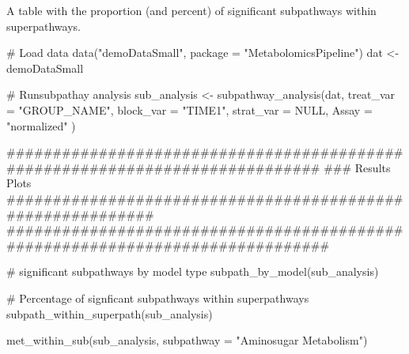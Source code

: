 \documentclass[a4paper]{book}
\begin{document}
%
\begin{Value}
A table with the proportion (and percent) of significant subpathways
within superpathways.
\end{Value}
%
\begin{Examples}
\begin{ExampleCode}

# Load data
data("demoDataSmall", package = "MetabolomicsPipeline")
dat <- demoDataSmall

# Runsubpathay analysis
sub_analysis <- subpathway_analysis(dat,
    treat_var = "GROUP_NAME",
    block_var = "TIME1",
    strat_var = NULL,
    Assay = "normalized"
)

#############################################################################
### Results Plots ###########################################################
##############################################################################

# significant subpathways by model type
subpath_by_model(sub_analysis)

# Percentage of signficant subpathways within superpathways
subpath_within_superpath(sub_analysis)

met_within_sub(sub_analysis, subpathway = "Aminosugar Metabolism")

\end{ExampleCode}
\end{Examples}
\printindex{}
\end{document}
